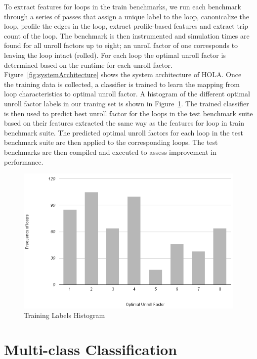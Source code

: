 \documentclass[]{sig-alternate}
\begin{document}
To extract features for loops in the train benchmarks, we run each benchmark through a series of passes that assign a unique label to the loop, canonicalize the loop, profile the edges in the loop, extract profile-based features and extract trip count of the loop. The benchmark is then instrumented and simulation times are found for all unroll factors up to eight; an unroll factor of one corresponds to leaving the loop intact (rolled). For each loop the optimal unroll factor is determined based on the runtime for each unroll factor. Figure~\ref{fig:systemArchitecture} shows the system architecture of HOLA. Once the training data is collected, a classifier is trained to learn the mapping from loop characteristics to optimal unroll factor. A histogram of the different optimal unroll factor labels in our traning set is shown in Figure~\ref{fig:trainingHistogram}. The trained classifier is then used to predict best unroll factor for the loops in the test benchmark suite based on their features extracted the same way as the features for loop in train benchmark suite. The predicted optimal unroll factors for each loop in the test benchmark suite are then applied to the corresponding loops. The test benchmarks are then compiled and executed to assess improvement in performance. 


\begin{figure}
  \center
  \includegraphics[width=0.90\linewidth]{fig/histogram.png}
  \caption{Training Labels Histogram}
  \label{fig:trainingHistogram}
\end{figure}

\section{Multi-class Classification}
\label{sec:Multi-classClassification}
\end{document}
